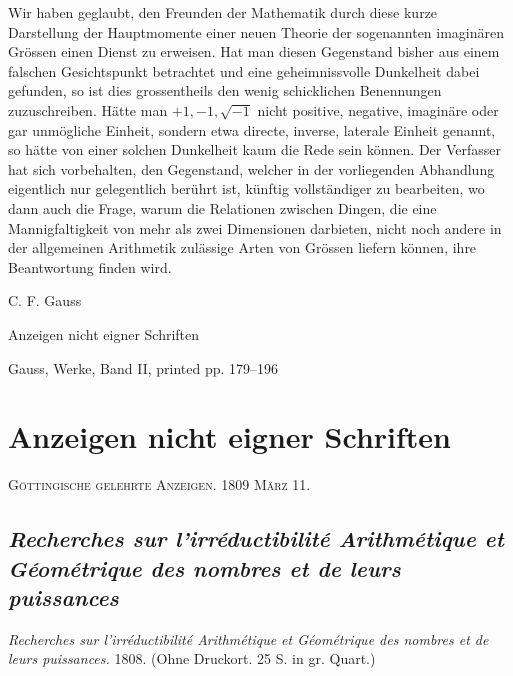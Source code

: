 \documentclass[12pt]{article}
\begin{document}
Wir haben geglaubt, den Freunden der Mathematik durch diese kurze Darstellung der Hauptmomente einer neuen Theorie der sogenannten imaginären Grössen einen Dienst zu erweisen. Hat man diesen Gegenstand bisher aus einem falschen Gesichtspunkt betrachtet und eine geheimnissvolle Dunkelheit dabei gefunden, so ist dies grossentheils den wenig schicklichen Benennungen zuzuschreiben. Hätte man $+1,-1,\sqrt{-1}$ nicht positive, negative, imaginäre oder gar unmögliche Einheit, sondern etwa directe, inverse, laterale Einheit genannt, so hätte von einer solchen Dunkelheit kaum die Rede sein können. Der Verfasser hat sich vorbehalten, den Gegenstand, welcher in der vorliegenden Abhandlung eigentlich nur gelegentlich berührt ist, künftig vollständiger zu bearbeiten, wo dann auch die Frage, warum die Relationen zwischen Dingen, die eine Mannigfaltigkeit von mehr als zwei Dimensionen darbieten, nicht noch andere in der allgemeinen Arithmetik zulässige Arten von Grössen liefern können, ihre Beantwortung finden wird.


\clearpage
{}

\begin{center}
{\Large C. F. Gauss}\par
{\large Anzeigen nicht eigner Schriften}\par
{\normalsize Gauss, Werke, Band II, printed pp. 179--196}\par
\end{center}

\section*{Anzeigen nicht eigner Schriften}

\begin{center}
\textsc{Göttingische gelehrte Anzeigen. 1809 März 11.}
\end{center}

\subsection*{\textit{Recherches sur l'irréductibilité Arithmétique et Géométrique des nombres et de leurs puissances}}

\begin{center}
\textit{Recherches sur l'irréductibilité Arithmétique et Géométrique des nombres et de leurs puissances.} 1808. (Ohne Druckort. 25 S. in gr. Quart.)
\end{center}
\end{document}
